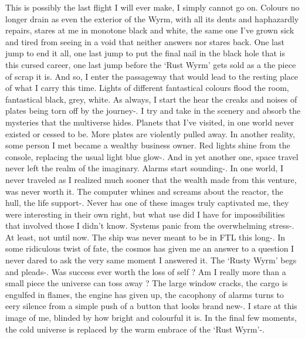 This is possibly the last flight I will ever make, I simply cannot go on. Colours no longer drain as even the exterior of the Wyrm, with all its dents and haphazardly repairs, stares at me in monotone black and white, the same one I've grown sick and tired from seeing in a void that neither answers nor stares back. One last jump to end it all, one last jump to put the final nail in the black hole that is this cursed career, one last jump before the `Rust Wyrm' gets sold as a the piece of scrap it is. And so, I enter the passageway that would lead to the resting place of what I carry this time. Lights of different fantastical colours flood the room, fantastical black, grey, white. As always, I start the hear the creaks and noises of plates being torn off by the journey-. I try and take in the scenery and absorb the mysteries that the multiverse hides. Planets that I've visited, in one world never existed or cessed to be. More plates are violently pulled away. In another reality, some person I met became a wealthy business owner. Red lights shine from the console, replacing the usual light blue glow-. And in yet another one, space travel never left the realm of the imaginary. Alarms start sounding-. In one world, I never traveled as I realized much sooner that the wealth made from this venture, was never worth it. The computer whines and screams about the reactor, the hull, the life support-. Never has one of these images truly captivated me, they were interesting in their own right, but what use did I have for impossibilities that involved those I didn't know. Systems panic from the overwhelming stress-. At least, not until now. The ship was never meant to be in FTL this long-. In some ridiculous twist of fate, the cosmos has given me an answer to a question I never dared to ask the very same moment I answered it. The `Rusty Wyrm' begs and pleads-. Was success ever worth the loss of self ? Am I really more than a small piece the universe can toss away ? The large window cracks, the cargo is engulfed in flames, the engine has given up, the cacophony of alarms turns to eery silence from a simple push of a button that looks brand new-. I stare at this image of me, blinded by how bright and colourful it is. In the final few moments, the cold universe is replaced by the warm embrace of the `Rust Wyrm'-.